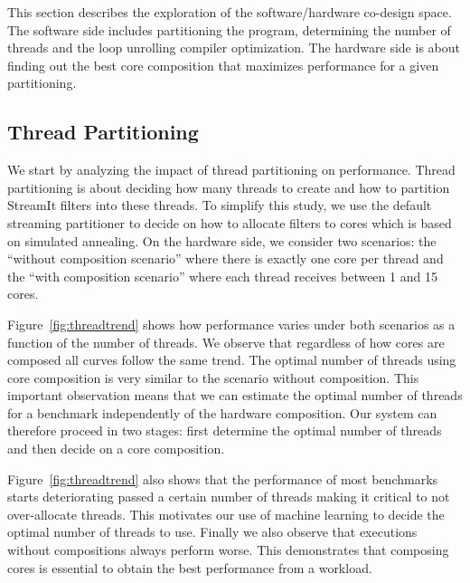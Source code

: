 This section describes the exploration of the software/hardware co-design space.
The software side includes partitioning the program, determining the number of threads and the loop unrolling compiler optimization.
The hardware side is about finding out the best core composition that maximizes performance for a given partitioning.

\subsection{Thread Partitioning}

We start by analyzing the impact of thread partitioning on performance.
Thread partitioning is about deciding how many threads to create and how to partition StreamIt filters into these threads.
To simplify this study, we use the default streaming partitioner to decide on how to allocate filters to cores which is based on simulated annealing.
On the hardware side, we consider two scenarios:
the ``without composition scenario'' where there is exactly one core per thread and the ``with composition scenario'' where each thread receives between 1 and 15 cores.

Figure~\ref{fig:threadtrend} shows how performance varies under both scenarios as a function of the number of threads.
We observe that regardless of how cores are composed all curves follow the same trend.
The optimal number of threads using core composition is very similar to the scenario without composition.
This important observation means that we can estimate the optimal number of threads for a benchmark independently of the hardware composition.
Our system can therefore proceed in two stages: first determine the optimal number of threads and then decide on a core composition.

Figure~\ref{fig:threadtrend} also shows that the performance of most benchmarks starts deteriorating passed a certain number of threads making it critical to not over-allocate threads.
This motivates our use of machine learning to decide the optimal number of threads to use.
Finally we also observe that executions without compositions always perform worse.
This demonstrates that composing cores is essential to obtain the best performance from a workload.

